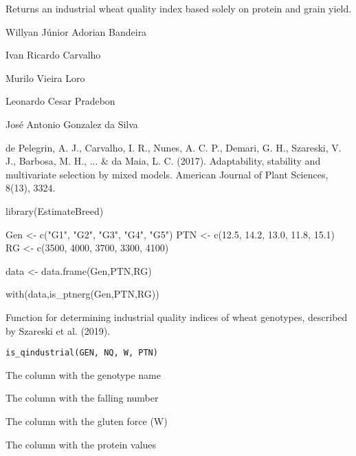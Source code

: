 \documentclass[a4paper]{book}
\begin{document}
%
\begin{Value}
Returns an industrial wheat quality index based solely on protein and
grain yield.
\end{Value}
%
\begin{Author}
Willyan Júnior Adorian Bandeira

Ivan Ricardo Carvalho

Murilo Vieira Loro

Leonardo Cesar Pradebon

José Antonio Gonzalez da Silva
\end{Author}
%
\begin{References}
de Pelegrin, A. J., Carvalho, I. R., Nunes, A. C. P., Demari, G. H., Szareski,
V. J., Barbosa, M. H., ... \& da Maia, L. C. (2017).
Adaptability, stability and multivariate selection by mixed models.
American Journal of Plant Sciences, 8(13), 3324.
\end{References}
%
\begin{Examples}
\begin{ExampleCode}

library(EstimateBreed)

Gen <- c("G1", "G2", "G3", "G4", "G5")
PTN <- c(12.5, 14.2, 13.0, 11.8, 15.1)
RG <- c(3500, 4000, 3700, 3300, 4100)

data <- data.frame(Gen,PTN,RG)

with(data,is_ptnerg(Gen,PTN,RG))

\end{ExampleCode}
\end{Examples}
%
\begin{Description}
Function for determining industrial quality indices of wheat genotypes,
described by Szareski et al. (2019).
\end{Description}
%
\begin{Usage}
\begin{verbatim}
is_qindustrial(GEN, NQ, W, PTN)
\end{verbatim}
\end{Usage}
%
\begin{Arguments}
\begin{ldescription}
\item[\code{GEN}] The column with the genotype name

\item[\code{NQ}] The column with the falling number

\item[\code{W}] The column with the gluten force (W)

\item[\code{PTN}] The column with the protein values
\end{ldescription}
\end{Arguments}
\end{document}
